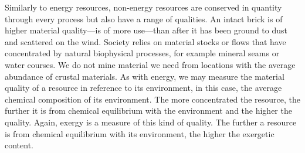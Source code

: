 
%
%

Similarly to energy resources, 
non-energy resources are conserved in quantity through
every process but also have a range of qualities.
An intact brick is of higher material quality---is of more use---than
after it has been ground to dust and scattered on the wind.
Society relies on material stocks or flows 
that have concentrated by natural biophysical processes,
for example mineral seams or water courses. 
We do not mine material we need from locations with
the average abundance of crustal materials.
As with energy,
we may measure the material quality of a resource
in reference to its environment,
in this case,
the average chemical composition of
its environment.
The more concentrated the resource,
the further it is from chemical equilibrium
with the environment and the higher the quality.
Again, exergy is a measure of this kind of quality.
The further a resource is from chemical equilibrium
with its environment,
the higher the exergetic content.


